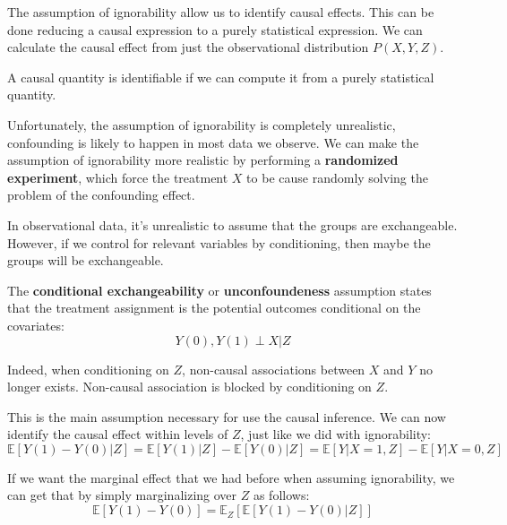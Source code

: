 The assumption of ignorability allow us to identify causal effects. This can be
done reducing a causal expression to a purely statistical expression. We can
calculate the causal effect from just the observational distribution $P(X, Y, Z)$.

\begin{definition}[Identifiability]
    A causal quantity is identifiable if we can compute it from a purely statistical
    quantity.
\end{definition}

Unfortunately, the assumption of ignorability is completely unrealistic, confounding
is likely to happen in most data we observe. We can make the assumption of ignorability
more realistic by performing a \textbf{randomized experiment}, which force the treatment
$X$ to be cause randomly solving the problem of the confounding effect.

In observational data, it's unrealistic to assume that the groups are exchangeable.
However, if we control for relevant variables by conditioning, then maybe the groups
will be exchangeable.

\begin{definition}
    The \textbf{conditional exchangeability} or \textbf{unconfoundeness} assumption
    states that the treatment assignment is the potential outcomes conditional
    on the covariates:
    \begin{equation}
        Y(0), Y(1) \perp X | Z
    \end{equation}
\end{definition}

Indeed, when conditioning on $Z$, non-causal associations between $X$ and $Y$ no
longer exists. Non-causal association is blocked by conditioning on $Z$.

This is the main assumption necessary for use the causal inference. We can now identify
the causal effect within levels of $Z$, just like we did with ignorability:
\begin{equation}
    \mathbb{E}[Y(1) - Y(0) | Z] = \mathbb{E}[Y(1)| Z] - \mathbb{E}[Y(0)| Z] =
    \mathbb{E}[Y|X = 1, Z] - \mathbb{E}[Y|X = 0, Z]
\end{equation}

If we want the marginal effect that we had before when assuming ignorability, we
can get that by simply marginalizing over $Z$ as follows:
\begin{equation}
    \mathbb{E}[Y(1) - Y(0)] = \mathbb{E}_Z[\mathbb{E}[Y(1) - Y(0) | Z]]
\end{equation}

